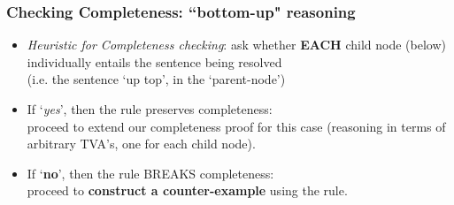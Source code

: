 \begin{frame}
\frametitle{Checking Completeness: ``bottom-up" reasoning}

\begin{itemize}[<+->]

\item \emph{Heuristic for Completeness checking}: ask whether \textbf{EACH} child node (below) individually entails the sentence being resolved \\ (i.e. the sentence `up top', in the `parent-node')


\item If `\emph{yes}', then the rule preserves completeness: \\ proceed to extend our completeness proof for this case (reasoning in terms of arbitrary TVA's, one for each child node). 

\item If `\textbf{\textcolor{OGlyallpink}{no}}', then the rule BREAKS completeness: \\ proceed to \textbf{\textcolor{OGlyallpink}{construct a counter-example}} using the rule. 

\end{itemize}
\end{frame}


